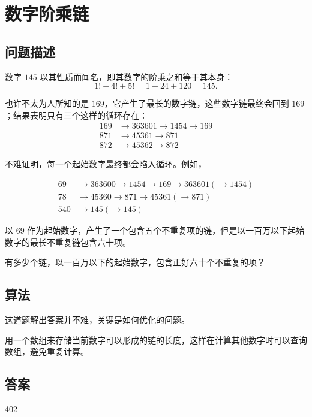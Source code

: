 \section{数字阶乘链}\label{sec:problem74}
\subsection{问题描述}
\begin{tcolorbox}

	数字 $145$ 以其性质而闻名，即其数字的阶乘之和等于其本身：
	\[1! + 4! + 5! = 1 + 24 + 120 = 145.\]

	也许不太为人所知的是 $169$，它产生了最长的数字链，这些数字链最终会回到 $169$；结果表明只有三个这样的循环存在：
	\begin{align*}
		169 & \rightarrow 363601 \rightarrow 1454 \rightarrow 169 \\
		871 & \rightarrow 45361 \rightarrow 871                   \\
		872 & \rightarrow 45362 \rightarrow 872
	\end{align*}

	不难证明，每一个起始数字最终都会陷入循环。例如，

	\begin{align*}
		69  & \rightarrow 363600 \rightarrow 1454 \rightarrow 169 \rightarrow 363601 (\rightarrow 1454) \\
		78  & \rightarrow 45360 \rightarrow 871 \rightarrow 45361 (\rightarrow 871)                     \\
		540 & \rightarrow 145 (\rightarrow 145)
	\end{align*}

	以 $69$ 作为起始数字，产生了一个包含五个不重复项的链，但是以一百万以下起始数字的最长不重复链包含六十项。

	有多少个链，以一百万以下的起始数字，包含正好六十个不重复的项？
\end{tcolorbox}

\subsection{算法}
这道题解出答案并不难，关键是如何优化的问题。

用一个数组来存储当前数字可以形成的链的长度，这样在计算其他数字时可以查询数组，避免重复计算。

\subsection{答案}
402
